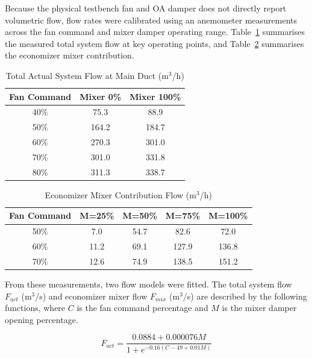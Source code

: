 \documentclass[12pt, a4paper]{article}
\begin{document}
	Because the physical testbench fan and OA damper does not directly report volumetric flow, flow rates were calibrated using an anemometer measurements  across the fan command and mixer damper operating range. Table~\ref{tab:flow_calibration} summarises the measured total system flow at key operating points, and Table~\ref{tab:mixer_flow} summarises the economizer mixer contribution.
	
	\begin{table}[h]
		\centering
		\caption{Total Actual System Flow at  Main Duct (m$^3$/h)}
		\label{tab:flow_calibration}
		\begin{tabular}{ccc}
			\toprule
			\textbf{Fan Command} & \textbf{Mixer 0\%} & \textbf{Mixer 100\%} \\
			\midrule
			40\% & 75.3 & 88.9 \\
			50\% & 164.2 & 184.7 \\
			60\% & 270.3 & 301.0 \\
			70\% & 301.0 & 331.8 \\
			80\% & 311.3 & 338.7 \\
			\bottomrule
		\end{tabular}
	\end{table}
	
	\begin{table}[h]
		\centering
		\caption{Economizer Mixer Contribution Flow (m$^3$/h)}
		\label{tab:mixer_flow}
		\begin{tabular}{ccccc}
			\toprule
			\textbf{Fan Command} & \textbf{M=25\%} & \textbf{M=50\%} & \textbf{M=75\%} & \textbf{M=100\%} \\
			\midrule
			50\% & 7.0 & 54.7 & 82.6 & 72.0 \\
			60\% & 11.2 & 69.1 & 127.9 & 136.8 \\
			70\% & 12.6 & 74.9 & 138.5 & 151.2 \\
			\bottomrule
		\end{tabular}
	\end{table}
	
	From these measurements, two flow models were fitted. The total system flow $F_{act}$ (m$^3$/s) and economizer mixer flow $F_{mix}$ (m$^3$/s) are described by the following  functions, where $C$ is the fan command percentage and $M$ is the mixer damper opening percentage.
	
	\begin{equation}
		F_{act} = \frac{0.0884 + 0.000076M}{1 + e^{-0.16(C - 49 + 0.01M)}}
	\end{equation}
	
\end{document}

